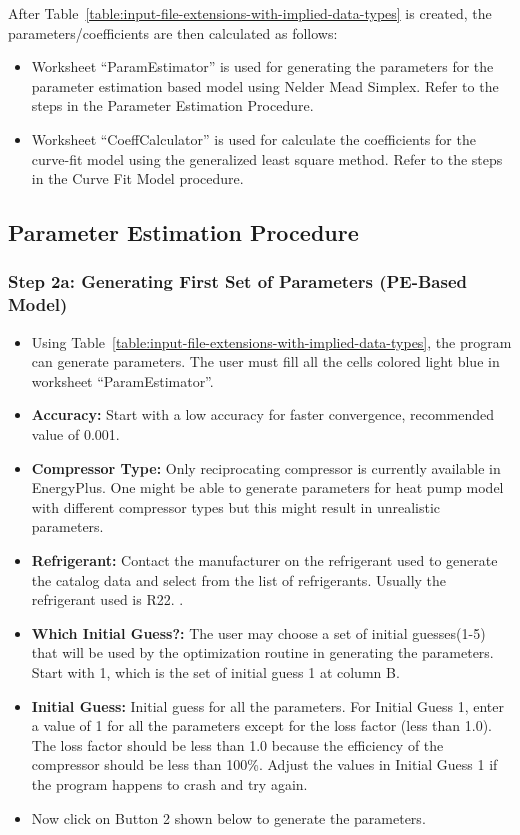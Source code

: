 After Table~\ref{table:input-file-extensions-with-implied-data-types} is created, the parameters/coefficients are then calculated as follows:

\begin{itemize}
\item
  Worksheet ``ParamEstimator'' is used for generating the parameters for the parameter estimation based model using Nelder Mead Simplex. Refer to the steps in the Parameter Estimation Procedure.
\item
  Worksheet ``CoeffCalculator'' is used for calculate the coefficients for the curve-fit model using the generalized least square method. Refer to the steps in the Curve Fit Model procedure.
\end{itemize}

\subsection{Parameter Estimation Procedure}\label{parameter-estimation-procedure-001}

\subsubsection{Step 2a: Generating First Set of Parameters (PE-Based Model)}\label{step-2a-generating-first-set-of-parameters-pe-based-model-001}

\begin{itemize}
\item
  Using Table~\ref{table:input-file-extensions-with-implied-data-types}, the program can generate parameters. The user must fill all the cells colored light blue in worksheet ``ParamEstimator''.
\item
  \textbf{Accuracy:} Start with a low accuracy for faster convergence, recommended value of 0.001.
\item
  \textbf{Compressor Type:} Only reciprocating compressor is currently available in EnergyPlus. One might be able to generate parameters for heat pump model with different compressor types but this might result in unrealistic parameters.
\item
  \textbf{Refrigerant:} Contact the manufacturer on the refrigerant used to generate the catalog data and select from the list of refrigerants. Usually the refrigerant used is R22. .
\item
  \textbf{Which Initial Guess?:} The user may choose a set of initial guesses(1-5) that will be used by the optimization routine in generating the parameters. Start with 1, which is the set of initial guess 1 at column B.
\item
  \textbf{Initial Guess:} Initial guess for all the parameters. For Initial Guess 1, enter a value of 1 for all the parameters except for the loss factor (less than 1.0). The loss factor should be less than 1.0 because the efficiency of the compressor should be less than 100\%. Adjust the values in Initial Guess 1 if the program happens to crash and try again.
\item
  Now click on Button 2 shown below to generate the parameters.
\end{itemize}

